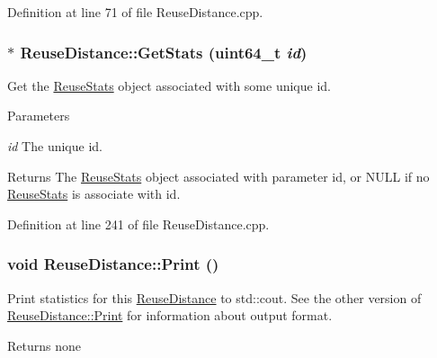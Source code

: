 Definition at line 71 of file ReuseDistance.cpp.\hypertarget{class_reuse_distance_a771580c25dc5140969919e959e2ebdd1}{
\subsubsection[{GetStats}]{ $\ast$ ReuseDistance::GetStats (uint64\_\-t {\em id})}}
\label{class_reuse_distance_a771580c25dc5140969919e959e2ebdd1}
Get the \hyperlink{class_reuse_stats}{ReuseStats} object associated with some unique id.


\begin{DoxyParams}{Parameters}
\item[{\em id}]The unique id.\end{DoxyParams}
\begin{DoxyReturn}{Returns}
The \hyperlink{class_reuse_stats}{ReuseStats} object associated with parameter id, or NULL if no \hyperlink{class_reuse_stats}{ReuseStats} is associate with id. 
\end{DoxyReturn}


Definition at line 241 of file ReuseDistance.cpp.\hypertarget{class_reuse_distance_a0cbab308f0c9262e570b994beac0544a}{
\subsubsection[{Print}]{\setlength{\rightskip}{0pt plus 5cm}void ReuseDistance::Print ()}}
\label{class_reuse_distance_a0cbab308f0c9262e570b994beac0544a}
Print statistics for this \hyperlink{class_reuse_distance}{ReuseDistance} to std::cout. See the other version of \hyperlink{class_reuse_distance_ac798c03bb891a51a6648df4b49e25212}{ReuseDistance::Print} for information about output format.

\begin{DoxyReturn}{Returns}
none 
\end{DoxyReturn}


